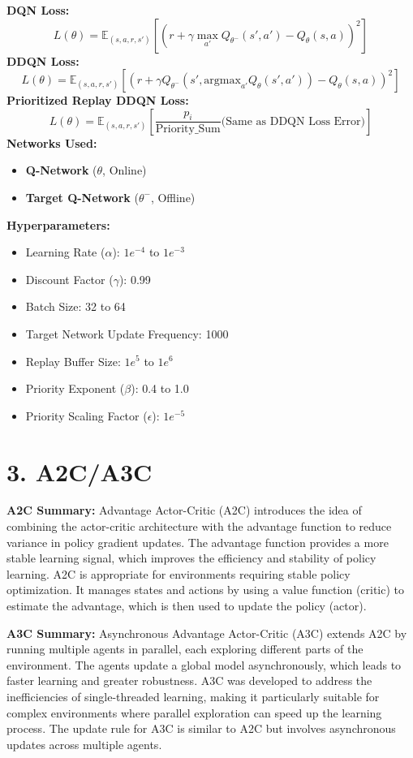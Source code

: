 \documentclass[a4paper,10pt]{article}
\begin{document}
\begin{multicols}{2}
\noindent \textbf{DQN Loss:}
\[
L(\theta) = \mathbb{E}_{(s, a, r, s')} \left[ \left( r + \gamma \max_{a'} Q_{\theta^-}(s', a') - Q_\theta(s, a) \right)^2 \right]
\]
\textbf{DDQN Loss:}
\[
L(\theta) = \mathbb{E}_{(s, a, r, s')} \left[ \left( r + \gamma Q_{\theta^-}(s', \text{argmax}_{a'} Q_\theta(s', a')) - Q_\theta(s, a) \right)^2 \right]
\]
\textbf{Prioritized Replay DDQN Loss:}
\[
L(\theta) = \mathbb{E}_{(s, a, r, s')} \left[ \frac{p_i}{\text{Priority\_Sum}} \text{(Same as DDQN Loss Error)} \right]
\]
\textbf{Networks Used:} 
\begin{itemize}
    \item \textbf{Q-Network} (\(\theta\), Online)
    \item \textbf{Target Q-Network} (\(\theta^-\), Offline)
\end{itemize}
\textbf{Hyperparameters:}
\begin{itemize}
    \item Learning Rate (\(\alpha\)): \(1e^{-4}\) to \(1e^{-3}\)
    \item Discount Factor (\(\gamma\)): 0.99
    \item Batch Size: 32 to 64
    \item Target Network Update Frequency: 1000
    \item Replay Buffer Size: \(1e^5\) to \(1e^6\)
    \item Priority Exponent (\(\beta\)): 0.4 to 1.0
    \item Priority Scaling Factor (\(\epsilon\)): \(1e^{-5}\)
\end{itemize}

\section*{3. A2C/A3C}
\textbf{A2C Summary:} Advantage Actor-Critic (A2C) introduces the idea of combining the actor-critic architecture with the advantage function to reduce variance in policy gradient updates. The advantage function provides a more stable learning signal, which improves the efficiency and stability of policy learning. A2C is appropriate for environments requiring stable policy optimization. It manages states and actions by using a value function (critic) to estimate the advantage, which is then used to update the policy (actor).

\noindent \textbf{A3C Summary:} Asynchronous Advantage Actor-Critic (A3C) extends A2C by running multiple agents in parallel, each exploring different parts of the environment. The agents update a global model asynchronously, which leads to faster learning and greater robustness. A3C was developed to address the inefficiencies of single-threaded learning, making it particularly suitable for complex environments where parallel exploration can speed up the learning process. The update rule for A3C is similar to A2C but involves asynchronous updates across multiple agents.


\end{multicols}
\end{document}
